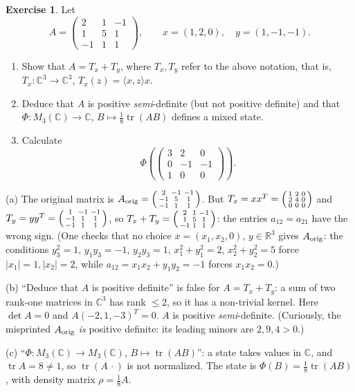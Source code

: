 \documentclass[11pt,a4paper]{article}
\numberwithin{equation}{section}
\newcommand{\R}{\mathbb{R}}
\newcommand{\C}{\mathbb{C}}
\newcommand{\ip}[2]{\langle #1, #2\rangle}
\DeclareMathOperator{\tr}{tr}
\theoremstyle{plain}
\theoremstyle{definition}
\newtheorem{exercise}[theorem]{Exercise}
\theoremstyle{plain}
\theoremstyle{definition}
\begin{document}
\begin{exercise}\label{exo:65}
Let
\[
A=\begin{pmatrix}2&1&-1\\1&5&1\\-1&1&1\end{pmatrix},\qquad x=(1,2,0),\quad y=(1,-1,-1).
\]
\begin{enumerate}
\item Show that $A=T_x+T_y$, where $T_x,T_y$ refer to the above notation, that is,
$T_x:\C^3\to\C^3$, $T_x(z)=\ip{x}{z}x$.
\item Deduce that $A$ is positive \emph{semi}-definite (but not positive definite) and that
$\Phi:M_3(\C)\to\C$, $B\mapsto\frac18\tr(AB)$ defines a mixed state.
\item Calculate
\[
\Phi\left(\begin{pmatrix}3&2&0\\0&-1&-1\\1&0&0\end{pmatrix}\right).
\]
\end{enumerate}
\end{exercise}

\begin{correction}
(a) The original matrix is
$A_{\rm orig}=\begin{psmallmatrix}2&-1&-1\\-1&5&1\\-1&1&1\end{psmallmatrix}$. But
$T_x=xx^T=\begin{psmallmatrix}1&2&0\\2&4&0\\0&0&0\end{psmallmatrix}$ and
$T_y=yy^T=\begin{psmallmatrix}1&-1&-1\\-1&1&1\\-1&1&1\end{psmallmatrix}$, so
$T_x+T_y=\begin{psmallmatrix}2&1&-1\\1&5&1\\-1&1&1\end{psmallmatrix}$: the entries
$a_{12}=a_{21}$ have the wrong sign. (One checks that no choice $x=(x_1,x_2,0)$, $y\in\R^3$
gives $A_{\rm orig}$: the conditions $y_3^2=1$, $y_1y_3=-1$, $y_2y_3=1$, $x_1^2+y_1^2=2$,
$x_2^2+y_2^2=5$ force $|x_1|=1,|x_2|=2$, while $a_{12}=x_1x_2+y_1y_2=-1$ forces $x_1x_2=0$.)

(b) ``Deduce that $A$ is positive definite'' is false for $A=T_x+T_y$: a sum of two rank-one
matrices in $\C^3$ has rank $\le2$, so it has a non-trivial kernel. Here
$\det A=0$ and $A(-2,1,-3)^T=0$. $A$ is positive \emph{semi}-definite.
(Curiously, the misprinted $A_{\rm orig}$ \emph{is} positive definite: its leading minors
are $2,9,4>0$.)

(c) ``$\Phi:M_3(\C)\to M_3(\C)$, $B\mapsto\tr(AB)$'': a state takes values in $\C$, and
$\tr A=8\ne1$, so $\tr(A\,\cdot)$ is not normalized. The state is
$\Phi(B)=\frac18\tr(AB)$, with density matrix $\rho=\frac18A$.
\end{correction}
\end{document}
